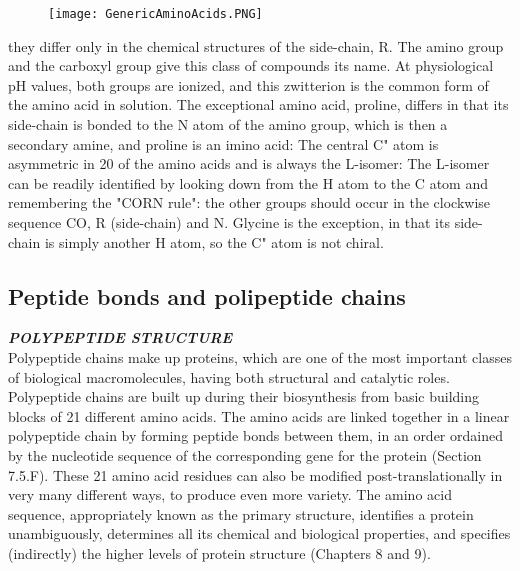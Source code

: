 \begin{figure}[h]
\centering
\begin{minipage}[t]{0.325\textwidth}
\centering
\texttt{[image: GenericAminoAcids.PNG]}


\label{fig:GenericAminoAcids}
\end{minipage} 
\end{figure}

they differ only in the chemical structures of the side-chain, R. The amino group and the carboxyl
group give this class of compounds its name. At physiological pH values, both groups are ionized,
and this zwitterion is the common form of the amino acid in solution. The exceptional amino acid,
proline, differs in that its side-chain is bonded to the N atom of the amino group, which is then a
secondary amine, and proline is an imino acid:
The central C" atom is asymmetric in 20 of the amino acids and is always the L-isomer:
The L-isomer can be readily identified by looking down from the H atom to the C atom and
remembering the "CORN rule": the other groups should occur in the clockwise sequence CO, R
(side-chain) and N. Glycine is the exception, in that its side-chain is simply another H atom, so the
C" atom is not chiral.
\cite{creighton2010biophysical}

\subsection{Peptide bonds and polipeptide chains}\label{ssec:peptitde}

\textit{\textbf{POLYPEPTIDE STRUCTURE}}\\
Polypeptide chains make up proteins, which are one of the most important classes of biological
macromolecules, having both structural and catalytic roles. Polypeptide chains are built up during
their biosynthesis from basic building blocks of 21 different amino acids. The amino acids are linked
together in a linear polypeptide chain by forming peptide bonds between them, in an order ordained
by the nucleotide sequence of the corresponding gene for the protein (Section 7.5.F). These 21 amino
acid residues can also be modified post-translationally in very many different ways, to produce even
more variety. The amino acid sequence, appropriately known as the primary structure, identifies a
protein unambiguously, determines all its chemical and biological properties, and specifies (indirectly)
the higher levels of protein structure (Chapters 8 and 9).

